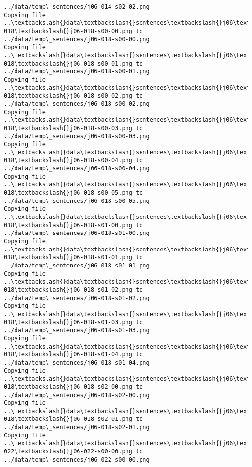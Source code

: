 \documentclass[11pt]{article}
\begin{document}
\begin{Verbatim}[commandchars=\\\{\}]
../data/temp\_sentences/j06-014-s02-02.png
Copying file ..\textbackslash{}data\textbackslash{}sentences\textbackslash{}j06\textbackslash{}j06-018\textbackslash{}j06-018-s00-00.png to
../data/temp\_sentences/j06-018-s00-00.png
Copying file ..\textbackslash{}data\textbackslash{}sentences\textbackslash{}j06\textbackslash{}j06-018\textbackslash{}j06-018-s00-01.png to
../data/temp\_sentences/j06-018-s00-01.png
Copying file ..\textbackslash{}data\textbackslash{}sentences\textbackslash{}j06\textbackslash{}j06-018\textbackslash{}j06-018-s00-02.png to
../data/temp\_sentences/j06-018-s00-02.png
Copying file ..\textbackslash{}data\textbackslash{}sentences\textbackslash{}j06\textbackslash{}j06-018\textbackslash{}j06-018-s00-03.png to
../data/temp\_sentences/j06-018-s00-03.png
Copying file ..\textbackslash{}data\textbackslash{}sentences\textbackslash{}j06\textbackslash{}j06-018\textbackslash{}j06-018-s00-04.png to
../data/temp\_sentences/j06-018-s00-04.png
Copying file ..\textbackslash{}data\textbackslash{}sentences\textbackslash{}j06\textbackslash{}j06-018\textbackslash{}j06-018-s00-05.png to
../data/temp\_sentences/j06-018-s00-05.png
Copying file ..\textbackslash{}data\textbackslash{}sentences\textbackslash{}j06\textbackslash{}j06-018\textbackslash{}j06-018-s01-00.png to
../data/temp\_sentences/j06-018-s01-00.png
Copying file ..\textbackslash{}data\textbackslash{}sentences\textbackslash{}j06\textbackslash{}j06-018\textbackslash{}j06-018-s01-01.png to
../data/temp\_sentences/j06-018-s01-01.png
Copying file ..\textbackslash{}data\textbackslash{}sentences\textbackslash{}j06\textbackslash{}j06-018\textbackslash{}j06-018-s01-02.png to
../data/temp\_sentences/j06-018-s01-02.png
Copying file ..\textbackslash{}data\textbackslash{}sentences\textbackslash{}j06\textbackslash{}j06-018\textbackslash{}j06-018-s01-03.png to
../data/temp\_sentences/j06-018-s01-03.png
Copying file ..\textbackslash{}data\textbackslash{}sentences\textbackslash{}j06\textbackslash{}j06-018\textbackslash{}j06-018-s01-04.png to
../data/temp\_sentences/j06-018-s01-04.png
Copying file ..\textbackslash{}data\textbackslash{}sentences\textbackslash{}j06\textbackslash{}j06-018\textbackslash{}j06-018-s02-00.png to
../data/temp\_sentences/j06-018-s02-00.png
Copying file ..\textbackslash{}data\textbackslash{}sentences\textbackslash{}j06\textbackslash{}j06-018\textbackslash{}j06-018-s02-01.png to
../data/temp\_sentences/j06-018-s02-01.png
Copying file ..\textbackslash{}data\textbackslash{}sentences\textbackslash{}j06\textbackslash{}j06-022\textbackslash{}j06-022-s00-00.png to
../data/temp\_sentences/j06-022-s00-00.png

\end{Verbatim}
\end{document}
